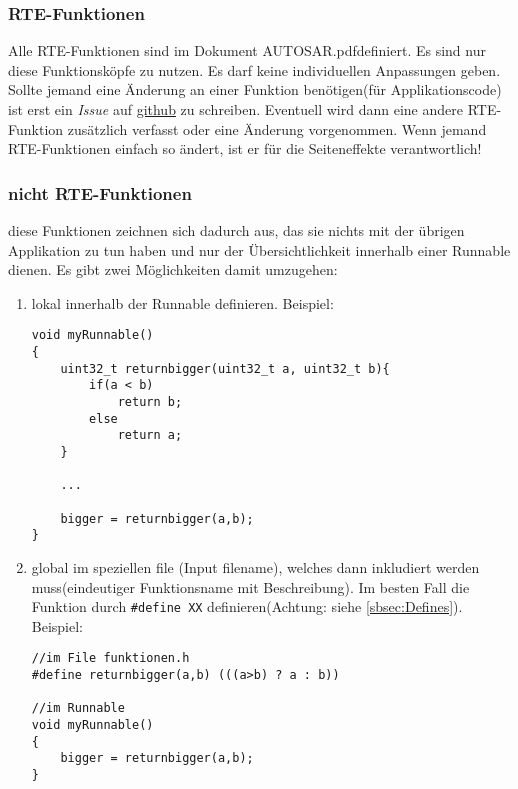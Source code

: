 \documentclass[]{scrartcl}
\newcommand{\DokAutosar}{AUTOSAR.pdf}
\begin{document}
\subsubsection{RTE-Funktionen}
\label{sbbsec:RTE-Funktionen}
Alle RTE-Funktionen sind im Dokument \DokAutosar definiert. Es sind nur diese Funktionsköpfe zu nutzen. Es darf keine individuellen Anpassungen geben. Sollte jemand eine Änderung an einer Funktion benötigen(für Applikationscode) ist erst ein \textit{Issue} auf \href{www.github.com}{github} zu schreiben. Eventuell wird dann eine andere RTE-Funktion zusätzlich verfasst oder eine Änderung vorgenommen. Wenn jemand RTE-Funktionen einfach so ändert, ist er für die Seiteneffekte verantwortlich!


\subsubsection{nicht RTE-Funktionen}
\label{sbbsec:nicht RTE-Funktionen}
diese Funktionen zeichnen sich dadurch aus, das sie nichts mit der übrigen Applikation zu tun haben und nur der Übersichtlichkeit innerhalb einer Runnable dienen. Es gibt zwei Möglichkeiten damit umzugehen:
\begin{enumerate}[1.)]
\item lokal innerhalb der Runnable definieren. Beispiel:
\begin{lstlisting}
void myRunnable()
{
	uint32_t returnbigger(uint32_t a, uint32_t b){
		if(a < b)
			return b;
		else
			return a;
	}
	
	...
	
	bigger = returnbigger(a,b);
}
\end{lstlisting}
\item global im speziellen file (Input filename), welches dann inkludiert werden muss(eindeutiger Funktionsname mit Beschreibung).
Im besten Fall die Funktion durch \lstinline|#define XX| definieren(Achtung: siehe \ref{sbsec:Defines}). Beispiel:
\begin{lstlisting}
//im File funktionen.h
#define returnbigger(a,b) (((a>b) ? a : b))

//im Runnable
void myRunnable()
{
	bigger = returnbigger(a,b);
}
\end{lstlisting}

\end{enumerate}
\end{document}
